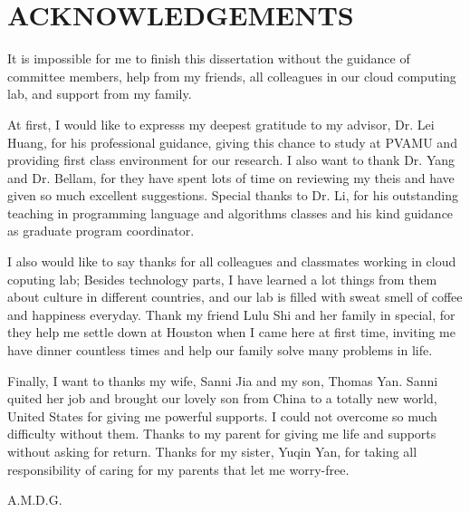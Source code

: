 %
%
%


\chapter*{ACKNOWLEDGEMENTS}

It is impossible for me to finish this dissertation without the guidance of committee members, help from my friends, all colleagues in our cloud computing lab, and support from my family.

At first, I would like to expresss my deepest gratitude to my advisor, Dr. Lei Huang, for his professional guidance, giving this chance to study at PVAMU and providing first class environment for our research. I also want to thank Dr. Yang and Dr. Bellam, for they have spent lots of time on reviewing my theis and have given so much excellent suggestions. Special thanks to Dr. Li, for his outstanding teaching in programming language and algorithms classes and his kind guidance as graduate program coordinator.

I also would like to say thanks for all colleagues and classmates working in cloud coputing lab; Besides technology parts, I have learned a lot things from them about culture in different countries, and our lab is filled with sweat smell of coffee and happiness everyday. Thank my friend Lulu Shi and her family in special, for they help me settle down at Houston when I came here at first time, inviting me have dinner countless times and help our family solve many problems in life.

Finally, I want to thanks my wife, Sanni Jia and my son, Thomas Yan. Sanni quited her job and brought our lovely son from China to a totally new world, United States for giving me powerful supports. I could not overcome so much difficulty without them. Thanks to my parent for giving me life and supports without asking for return. Thanks for my sister, Yuqin Yan, for taking all responsibility of caring for my parents that let me worry-free.   


\pagebreak{}
\vspace*{\fill}
\begin{center}
A.M.D.G.
\end{center}
\vspace*{\fill}
\pagebreak{}
